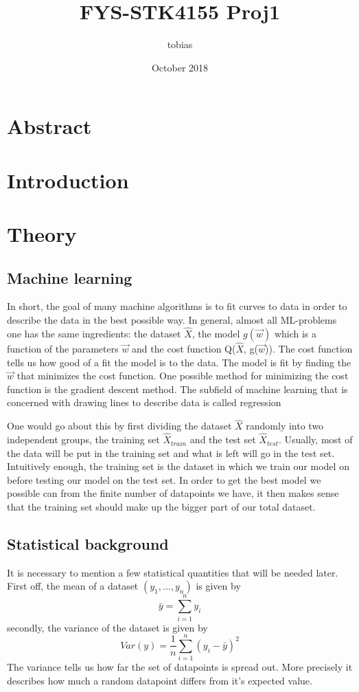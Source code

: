 \documentclass[a4paper,12pt]{article}
\title{FYS-STK4155 Proj1}
\author{tobias }
\date{October 2018}
\begin{document}
\maketitle

\section{Abstract}

\section{Introduction}

\section{Theory}

\subsection{Machine learning}
In short, the goal of many machine algorithms is to fit curves to data in order to describe the data in the best possible way. In general, almost all ML-problems one has the same ingredients: the dataset $\hat{X}$, the model $g(\vec{w})$ which is a function of the parameters $\vec{w}$ and the cost function Q($\hat{X}$, g($\vec{w}$)). The cost function tells us how good of a fit the model is to the data. The model is fit by finding the $\vec{w}$ that minimizes the cost function. One possible method for minimizing the cost function is the gradient descent method. The subfield of machine learning that is concerned with drawing lines to describe data is called regression \newline

One would go about this by first dividing the dataset $\hat{X}$ randomly into two independent groups, the training set $\hat{X}_{train}$ and the test set $\hat{X}_{test}$. Usually, most of the data will be put in the training set and what is left will go in the test set. Intuitively enough, the training set is the dataset in which we train our model on before testing our model on the test set. In order to get the best model we possible can from the finite number of datapoints we have, it then makes sense that the training set should make up the bigger part of our total dataset.

\subsection{Statistical background}
It is necessary to mention a few statistical quantities that will be needed later. First off, the mean of a dataset $(y_1, ..., y_n)$ is given by
\begin{equation}
\bar{y}=\sum_{i=1}^n y_i
\end{equation}
secondly, the variance of the dataset is given by
\begin{equation}
Var(y)=\frac{1}{n}\sum_{i=1}^n(y_i-\bar{y})^2
\end{equation}
The variance tells us how far the set of datapoints is spread out. More precisely it describes how much a random datapoint differs from it's expected value. \newline
\end{document}
